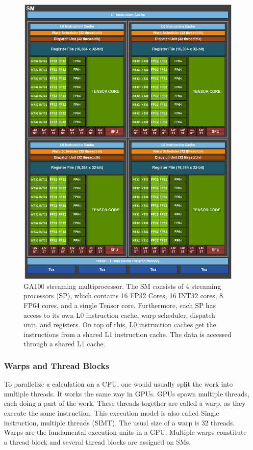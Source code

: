 \documentclass[conference]{IEEEtran}
\begin{document}
\begin{figure}[H]
    \centering
    \includegraphics[scale=0.2]{gpu_new.png}
    \caption{GA100 streaming multiprocessor. The SM consists of 4 streaming processors (SP), which contains 16 FP32 Cores, 16 INT32 cores, 8 FP64 cores, and a single Tensor core. Furthermore, each SP has access to its own L0 instruction cache, warp scheduler, dispatch unit, and registers. On top of this, L0 instruction caches get the instructions from a shared L1 instruction cache. The data is accessed through a shared L1 cache. }
    \label{fig:gpu}
\end{figure}



\subsubsection{Warps and Thread Blocks}

To parallelize a calculation on a CPU, one would usually split the work into multiple threads. It works the same way in GPUs. GPUs spawn multiple threads, each doing a part of the work. These threads together are called a warp, as they execute the same instruction. This execution model is also called Single instruction, multiple threads (SIMT). The usual size of a warp is 32 threads.  Warps are the fundamental execution units in a GPU. Multiple warps constitute a thread block and several thread blocks are assigned on SMs. \cite{b2}
\end{document}
